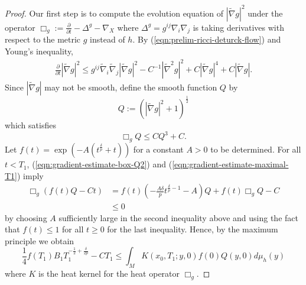\documentclass[12pt]{amsart}
\theoremstyle{plain}
\theoremstyle{plain}
\theoremstyle{definition}
\theoremstyle{remark}
\numberwithin{equation}{subsection}
\newcommand{\del}{\nabla}
\newcommand{\hdel}{\tilde{\nabla}}
\begin{document}
\begin{proof}
    Our first step is to compute the evolution equation of $|\hdel g|^2$ under the operator $\Box_g := \frac{\partial}{\partial t} - \Delta^{g} - \nabla_X$ where $\Delta^g = g^{ij}\del_i\del_j$ is taking derivatives with respect to the metric $g$ instead of $h$. By (\ref{eqn:prelim-ricci-deturck-flow}) and Young's inequality, 
    \begin{align}\label{eqn:gradient-estimate-partialt-norm-hdelg}
        \frac{\partial}{\partial t} |\hdel g|^2 \leq g^{ij}\hdel_i\hdel_j|\hdel g|^2 - C^{-1}|\hdel^2 g|^2 + C |\hdel g|^4 + C|\hdel g|.
    \end{align}
    Since $|\hdel g|$ may not be smooth, define the smooth function $Q$ by
    \begin{equation*}
        Q := \left(|\hdel g|^2 + 1\right)^{\frac{1}{2}}
    \end{equation*}
    which satisfies
    \begin{equation}\label{eqn:gradient-estimate-box-Q2}
        \Box_g Q \leq C Q^3 + C.
    \end{equation}
    Let $f(t) = \exp\left(-A(t^{\frac{\delta}{p}} +  t)\right)$ for a constant $A > 0$ to be determined. For all $t < T_1$, (\ref{eqn:gradient-estimate-box-Q2}) and (\ref{eqn:gradient-estimate-maximal-T1}) imply 
    \begin{align}\label{eqn:gradient-estimate-box-Q3}
        \Box_g\left(f(t)Q-Ct\right) &= f(t)\left(-\frac{A\delta}{p}t^{\frac{\delta}{p}-1} - A\right)Q + f(t)\Box_g Q - C \nonumber \\
        & \leq 0
    \end{align}
    by choosing $A$ sufficiently large in the second inequality above and using the fact that $f(t) \leq 1$ for all $t \geq 0$ for the last inequality.
    Hence, by the maximum principle we obtain
    \begin{equation}\label{eqn:gradient-estimate-invoke-heat-kernel}
        \frac14 f(T_1)B_1T_1^{-\frac{1}{2}+\frac{\delta}{2p}} - CT_1 \leq \int_{M} K(x_0, T_1; y, 0)f(0)Q(y,0)d\mu_h(y)
    \end{equation}
    where $K$ is the heat kernel for the heat operator $\Box_g$.
    

\end{proof}
\end{document}
